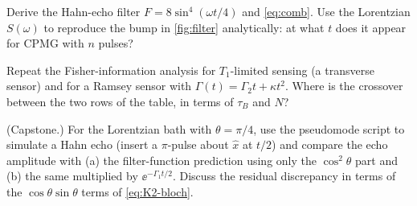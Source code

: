 \begin{exercise}\label{ex:10-2}
Derive the Hahn-echo filter $F=8\sin^4(\omega t/4)$ and \cref{eq:comb}.
Use the Lorentzian $S(\omega)$ to reproduce the bump in \cref{fig:filter} analytically: at what $t$ does it appear for CPMG with $n$ pulses?
\end{exercise}

\begin{exercise}\label{ex:10-3}
Repeat the Fisher-information analysis for $T_1$-limited sensing (a transverse sensor) and for a Ramsey sensor with $\Gamma(t)=\Gamma_2t+\kappa t^2$.
Where is the crossover between the two rows of the table, in terms of $\tau_B$ and $N$?
\end{exercise}

\begin{exercise}\label{ex:10-4}
(Capstone.)
For the Lorentzian bath with $\theta=\pi/4$, use the pseudomode script to simulate a Hahn echo (insert a $\pi$-pulse about $\hat x$ at $t/2$) and compare the echo amplitude with (a) the filter-function prediction using only the $\cos^2\theta$ part and (b) the same multiplied by $\ee^{-\Gamma_1t/2}$.
Discuss the residual discrepancy in terms of the $\cos\theta\sin\theta$ terms of \cref{eq:K2-bloch}.
\end{exercise}

\clearpage
